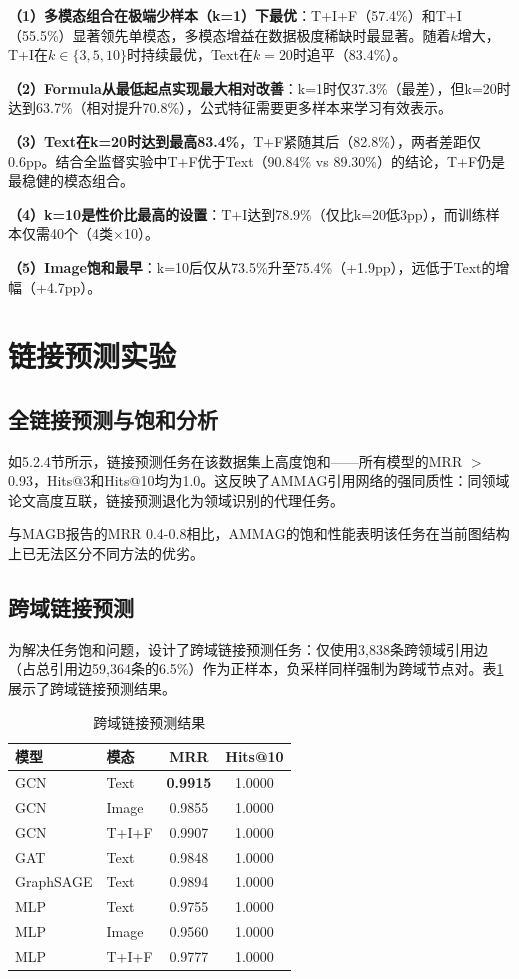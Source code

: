 \textbf{（1）多模态组合在极端少样本（k=1）下最优}：T+I+F（57.4\%）和T+I（55.5\%）显著领先单模态，多模态增益在数据极度稀缺时最显著。随着$k$增大，T+I在$k \in \{3,5,10\}$时持续最优，Text在$k=20$时追平（83.4\%）。

\textbf{（2）Formula从最低起点实现最大相对改善}：k=1时仅37.3\%（最差），但k=20时达到63.7\%（相对提升70.8\%），公式特征需要更多样本来学习有效表示。

\textbf{（3）Text在k=20时达到最高83.4\%}，T+F紧随其后（82.8\%），两者差距仅0.6pp。结合全监督实验中T+F优于Text（90.84\% vs 89.30\%）的结论，T+F仍是最稳健的模态组合。

\textbf{（4）k=10是性价比最高的设置}：T+I达到78.9\%（仅比k=20低3pp），而训练样本仅需40个（4类$\times$10）。

\textbf{（5）Image饱和最早}：k=10后仅从73.5\%升至75.4\%（+1.9pp），远低于Text的增幅（+4.7pp）。

\section{链接预测实验}

\subsection{全链接预测与饱和分析}

如5.2.4节所示，链接预测任务在该数据集上高度饱和——所有模型的MRR $>$ 0.93，Hits@3和Hits@10均为1.0。这反映了AMMAG引用网络的强同质性：同领域论文高度互联，链接预测退化为领域识别的代理任务。

与MAGB\cite{yan2025magb}报告的MRR 0.4-0.8相比，AMMAG的饱和性能表明该任务在当前图结构上已无法区分不同方法的优劣。

\subsection{跨域链接预测}

为解决任务饱和问题，设计了跨域链接预测任务：仅使用3,838条跨领域引用边（占总引用边59,364条的6.5\%）作为正样本，负采样同样强制为跨域节点对。表\ref{tab:cross_domain_lp}展示了跨域链接预测结果。

\begin{table}[htbp]
  \centering
  \caption{跨域链接预测结果}
  \label{tab:cross_domain_lp}
  \begin{tabular}{llcc}
    \toprule
    模型 & 模态 & MRR & Hits@10 \\
    \midrule
    GCN & Text & \textbf{0.9915} & 1.0000 \\
    GCN & Image & 0.9855 & 1.0000 \\
    GCN & T+I+F & 0.9907 & 1.0000 \\
    GAT & Text & 0.9848 & 1.0000 \\
    GraphSAGE & Text & 0.9894 & 1.0000 \\
    MLP & Text & 0.9755 & 1.0000 \\
    MLP & Image & 0.9560 & 1.0000 \\
    MLP & T+I+F & 0.9777 & 1.0000 \\
    \bottomrule
  \end{tabular}
\end{table}

